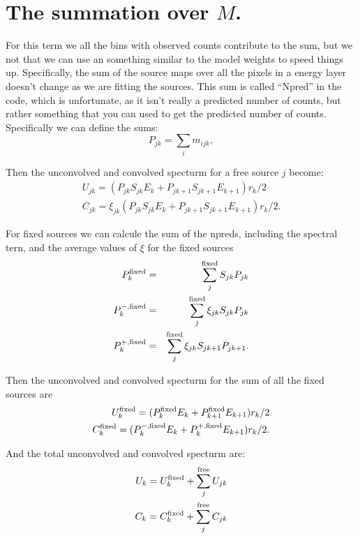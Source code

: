 \documentclass[preprint]{aastex}
\begin{document}
\section{The summation over $M$.}

For this term we all the bins with observed counts contribute to the sum,
but we not that we can use an something similar to the model weights to speed things
up.  Specifically, the sum of the source maps over all the pixels in a energy layer
doesn't change as we are fitting the sources.  This sum is called ``Npred'' in the
code, which is unfortunate, as it isn't really a predicted number of counts, but rather
something that you can used to get the predicted number of counts.  Specifically 
we can define the sums:
\begin{equation}
  P_{jk} = \sum_i m_{ijk},
\end{equation}

Then the unconvolved and convolved specturm for a free source $j$ become:
\begin{eqnarray}
  U_{jk} = ( P_{jk} S_{jk} E_k + P_{jk+1} S_{jk+1} E_{k+1} ) r_k / 2  \nonumber \\
  C_{jk} = \xi_{jk} ( P_{jk} S_{jk} E_k + P_{jk+1} S_{jk+1} E_{k+1} ) r_k / 2.
\end{eqnarray}

For fixed sources we can calcule the sum of the npreds, including the spectral tern, 
and the average values of $\xi$ for the fixed sources
\begin{eqnarray}
  P_{k}^{\rm fixed} & = & \sum_j^{\rm fixed} S_{jk} P_{jk} \nonumber \\
  P_{k}^{-, \rm fixed} & = & \sum_j^{\rm fixed} \xi_{jk} S_{jk} P_{jk}  \nonumber \\
  P_{k}^{+, \rm fixed} & = & \sum_j^{\rm fixed} \xi_{jk} S_{jk+1} P_{jk+1}.
\end{eqnarray}

Then the unconvolved and convolved specturm for the sum of all the fixed sources are
\begin{eqnarray}
  U_{k}^{\rm fixed} = ( P_{k}^{\rm fixed} E_k + P_{k+1}^{\rm fixed}  E_{k+1} )  r_k / 2  \nonumber \\
  C_{k}^{\rm fixed} = ( P_{k}^{-, \rm fixed} E_k + P_{k}^{+, \rm fixed} E_{k+1} )  r_k / 2.
\end{eqnarray}

And the total unconvolved and convolved specturm are:
\begin{eqnarray}
  U_{k} = U_{k}^{\rm fixed} + \sum_j^{\rm free} U_{jk} \nonumber \\
  C_{k} = C_{k}^{\rm fixed} + \sum_j^{\rm free} C_{jk} 
\end{eqnarray}
\end{document}
